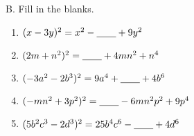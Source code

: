 B. Fill in the blanks. 
\begin{enumerate}[label = \arabic*. ]
\item \hspce $(x - 3y)^{2} = x^{2} - \underline{\hspace{2em}} + 9y^2$
\item \hspce $(2m + n^2)^{2} = \underline{\hspace{2em}} + 4mn^2 + n^4 $
\item \hspce $(-3a^2 - 2b^3)^{2} = 9a^4 + \underline{\hspace{2em}} + 4b^6 $
\item \hspce $(-mn^2 + 3p^2 )^{2} = \underline{\hspace{2em}} - 6mn^2p^2 + 9p^4$
\item \hspce $(5b^2c^3 - 2d^3)^{2} = 25b^4c^6 - \underline{\hspace{2em}} + 4d^6 $
\end{enumerate}  